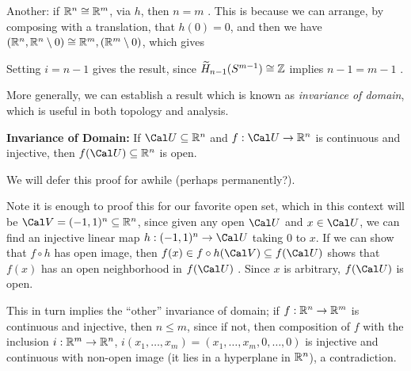 \msk

Another: if ${\Bbb R}^n\cong {\Bbb R}^m$, via $h$, then $n=m$ .
This is because we can arrange, by composing with a translation, that $h(0)=0$, and then 
we have 
$({\Bbb R}^n,{\Bbb R}^n\setminus 0)\cong {\Bbb R}^m,({\Bbb R}^m\setminus 0)$, which gives


\ssk



\ssk

Setting $i=n-1$ gives the result, since $\widetilde{H}_{n-1}(S^{m-1})\cong {\Bbb Z}$ implies $n-1=m-1$ .

\msk

More generally, we can establish a result which is known as {\it invariance of domain},
which is useful in both topology and analysis.

\msk

{\bf Invariance of Domain:} If ${\Cal U}\subseteq {\Bbb R}^n$ and $f:{\Cal U}\ra {\Bbb R}^n$
is continuous and injective, then $f({\Cal U})\subseteq {\Bbb R}^n$ is open.

\msk

We will defer this proof for awhile (perhaps permanently?). 

Note it is enough to proof this for our favorite open set, which in this context will be ${\Cal V}=(-1,1)^n\subseteq {\Bbb R}^n$,
since given any open ${\Cal U}$ and $x\in{\Cal U}$, we can find an injective linear map $h:(-1,1)^n\ra {\Cal U}$
taking $0$ to $x$. If we can show that $f\circ h$ has open image, then $f(x)\in f\circ h({\Cal V})\subseteq f({\Cal U})$
shows that $f(x)$ has an open neighborhood in $f({\Cal U})$ . Since $x$ is arbitrary, $f({\Cal U})$ is open.

\msk

\bsk

\msk

This in turn implies the ``other'' invariance of domain; if $f: {\Bbb R}^n\rightarrow {\Bbb R}^m$ is continuous and injective, then
$n\leq m$, since if not, then composition of $f$ with the inclusion $i:{\Bbb R}^m\rightarrow {\Bbb R}^n$, $i(x_1,\ldots ,x_m) = 
(x_1,\ldots ,x_m,0,\ldots ,0)$ is injective and continuous with non-open image (it lies in a hyperplane in ${\Bbb R}^n$),
a contradiction.


